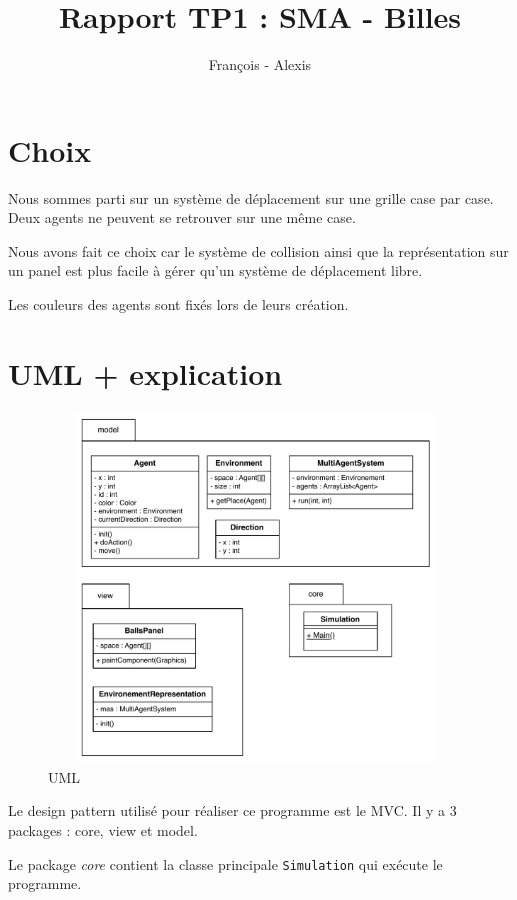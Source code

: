 \documentclass[a4paper,10pt]{article}
\title{Rapport TP1 : SMA - Billes}
\author{Fran\c{c}ois \bsc{Lepan} - Alexis \bsc{Linke}}
\begin{document}
\maketitle

\section{Choix}

Nous sommes parti sur un syst\`eme de d\'eplacement sur une grille case par case. Deux agents ne peuvent  se retrouver sur une m\^eme case.

Nous avons fait ce choix car le syst\`eme de collision ainsi que la repr\'esentation sur un panel est plus facile \`a g\'erer qu'un syst\`eme de d\'eplacement libre.

Les couleurs des agents sont fix\'es lors de leurs cr\'eation.

\section{UML + explication}

\begin{figure}[ht]
\begin{center}
	\includegraphics[height=9.3cm , width=11cm]{uml/sci_uml_tp1.pdf}
\end{center}
	\caption{UML}
	\label{uml}
\end{figure}

\newpage 

Le design pattern utilis\'e pour r\'ealiser ce programme est le MVC.  Il y a 3 packages : core, view et model. 

Le package \emph{core} contient la classe principale \verb&Simulation& qui ex\'ecute le programme. 
\end{document}
